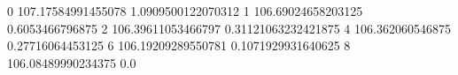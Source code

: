 0 107.17584991455078 1.0909500122070312
1 106.69024658203125 0.6053466796875
2 106.39611053466797 0.31121063232421875
4 106.362060546875 0.27716064453125
6 106.19209289550781 0.1071929931640625
8 106.08489990234375 0.0
